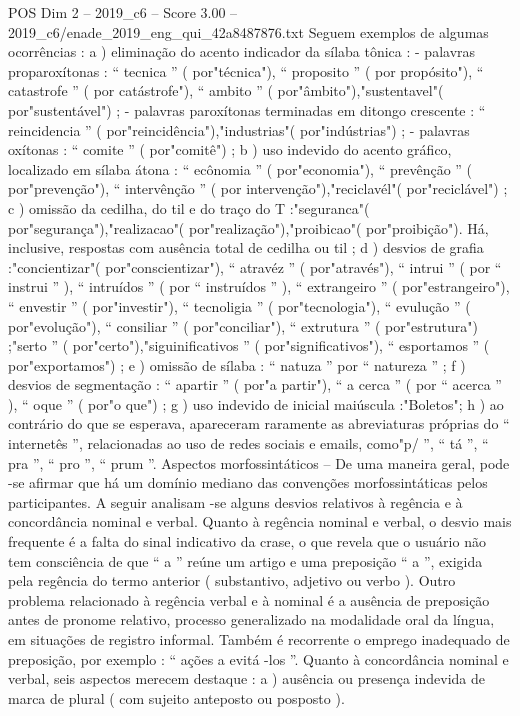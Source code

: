 \begin{textsample}{POS Dim 2 – 2019\_c6 – Score 3.00 – 2019\_c6/enade\_2019\_eng\_qui\_42a8487876.txt}
Seguem exemplos de algumas ocorrências : a ) eliminação do acento indicador da sílaba tônica : - palavras proparoxítonas : “ tecnica ” ( por"técnica"), “ proposito ” ( por propósito"), “ catastrofe ” ( por catástrofe"), “ ambito ” ( por"âmbito"),"sustentavel"( por"sustentável") ; - palavras paroxítonas terminadas em ditongo crescente : “ reincidencia ” ( por"reincidência"),"industrias"( por"indústrias") ; - palavras oxítonas : “ comite ” ( por"comitê") ; b ) uso indevido do acento gráfico, localizado em sílaba átona : “ ecônomia ” ( por"economia"), “ prevênção ” ( por"prevenção"), “ intervênção ” ( por intervenção"),"reciclavél"( por"reciclável") ; c ) omissão da cedilha, do til e do traço do T :"seguranca"( por"segurança"),"realizacao"( por"realização"),"proibicao"( por"proibição").
Há, inclusive, respostas com ausência total de cedilha ou til ; d ) desvios de grafia :"concientizar"( por"conscientizar"), “ atravéz ” ( por"através"), “ intrui ” ( por “ instrui ” ), “ intruídos ” ( por “ instruídos ” ), “ extrangeiro ” ( por"estrangeiro"), “ envestir ” ( por"investir"), “ tecnoligia ” ( por"tecnologia"), “ evulução ” ( por"evolução"), “ consiliar ” ( por"conciliar"), “ extrutura ” ( por"estrutura") ;"serto ” ( por"certo"),"siguinificativos ” ( por"significativos"), “ esportamos ” ( por"exportamos") ; e ) omissão de sílaba : “ natuza ” por “ natureza ” ; f ) desvios de segmentação : “ apartir ” ( por"a partir"), “ a cerca ” ( por “ acerca ” ), “ oque ” ( por"o que") ; g ) uso indevido de inicial maiúscula :"Boletos"; h ) ao contrário do que se esperava, apareceram raramente as abreviaturas próprias do “ internetês ”, relacionadas ao uso de redes sociais e emails, como"p/ ”, “ tá ”, “ pra ”, “ pro ”, “ prum ”.
Aspectos morfossintáticos – De uma maneira geral, pode -se afirmar que há um domínio mediano das convenções morfossintáticas pelos participantes.
A seguir analisam -se alguns desvios relativos à regência e à concordância nominal e verbal.
Quanto à regência nominal e verbal, o desvio mais frequente é a falta do sinal indicativo da crase, o que revela que o usuário não tem consciência de que “ a ” reúne um artigo e uma preposição “ a ”, exigida pela regência do termo anterior ( substantivo, adjetivo ou verbo ).
Outro problema relacionado à regência verbal e à nominal é a ausência de preposição antes de pronome relativo, processo generalizado na modalidade oral da língua, em situações de registro informal.
Também é recorrente o emprego inadequado de preposição, por exemplo : “ ações a evitá -los ”.
Quanto à concordância nominal e verbal, seis aspectos merecem destaque : a ) ausência ou presença indevida de marca de plural ( com sujeito anteposto ou posposto ).

\end{textsample}
